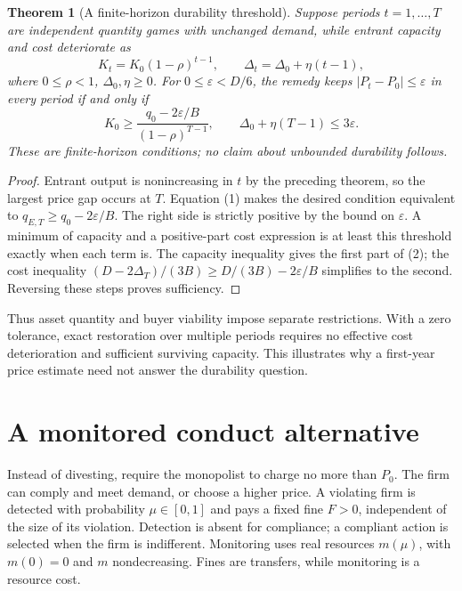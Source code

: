 \documentclass[11pt]{article}
\newtheorem{theorem}{Theorem}
\theoremstyle{remark}\newtheorem{remark}[theorem]{Remark}
\begin{document}
\begin{theorem}[A finite-horizon durability threshold]
Suppose periods $t=1,\ldots,T$ are independent quantity games with unchanged demand, while entrant capacity and cost deteriorate as
\[
 K_t=K_0(1-\rho)^{t-1},\qquad \Delta_t=\Delta_0+\eta(t-1),
\]
where $0\le\rho<1$, $\Delta_0,\eta\ge0$. For $0\le\varepsilon<D/6$, the remedy keeps $|P_t-P_0|\le\varepsilon$ in every period if and only if
\[
 K_0\ge\frac{q_0-2\varepsilon/B}{(1-\rho)^{T-1}},
 \qquad \Delta_0+\eta(T-1)\le3\varepsilon.
 \tag{2}
\]
These are finite-horizon conditions; no claim about unbounded durability follows.
\end{theorem}
\begin{proof}
Entrant output is nonincreasing in $t$ by the preceding theorem, so the largest price gap occurs at $T$. Equation (1) makes the desired condition equivalent to $q_{E,T}\ge q_0-2\varepsilon/B$. The right side is strictly positive by the bound on $\varepsilon$. A minimum of capacity and a positive-part cost expression is at least this threshold exactly when each term is. The capacity inequality gives the first part of (2); the cost inequality
$(D-2\Delta_T)/(3B)\ge D/(3B)-2\varepsilon/B$ simplifies to the second. Reversing these steps proves sufficiency.
\end{proof}

Thus asset quantity and buyer viability impose separate restrictions. With a zero tolerance, exact restoration over multiple periods requires no effective cost deterioration and sufficient surviving capacity. This illustrates why a first-year price estimate need not answer the durability question.

\section*{A monitored conduct alternative}
Instead of divesting, require the monopolist to charge no more than $P_0$. The firm can comply and meet demand, or choose a higher price. A violating firm is detected with probability $\mu\in[0,1]$ and pays a fixed fine $F>0$, independent of the size of its violation. Detection is absent for compliance; a compliant action is selected when the firm is indifferent. Monitoring uses real resources $m(\mu)$, with $m(0)=0$ and $m$ nondecreasing. Fines are transfers, while monitoring is a resource cost.
\end{document}
